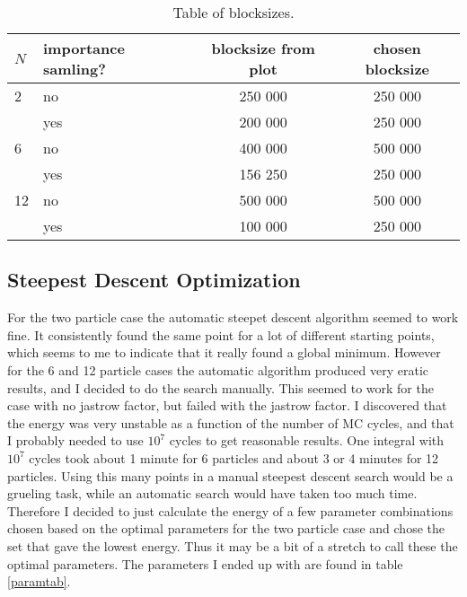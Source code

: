 \documentclass[a4paper,English,10pt]{article}
\begin{document}
\begin{table}
  \begin{center}
    \caption{Table of blocksizes. }
    \label{blocktable}
    \begin{tabular}{llcc}
      \toprule
      $N$ & importance samling? & blocksize from plot & chosen blocksize \\
      \midrule
      2 & no & 250 000 & 250 000\\
      & yes & 200 000 & 250 000\\
      \midrule
      6 & no & 400 000 & 500 000\\
      & yes & 156 250 & 250 000\\
      \midrule
      12 & no & 500 000 & 500 000\\
      & yes & 100 000 & 250 000\\
      \bottomrule
    \end{tabular}
  \end{center}
\end{table}



\subsection{Steepest Descent Optimization}
For the two particle case the automatic steepet descent algorithm seemed to work fine. It consistently found the same point
for a lot of different starting points, which seems to me to indicate that it really found a global minimum. However for the 6 and 12 particle
cases the automatic algorithm produced very eratic results, and I decided to do the search manually. This seemed to work for the case with no jastrow factor,
but failed with the jastrow factor. I discovered that the energy was very unstable as a function of the number of MC cycles, and that I probably needed
to use $10^7$ cycles to get reasonable results. One integral with $10^7$ cycles took about 1 minute for 6 particles and about 3 or 4 minutes for 12 particles.
Using this many points in a manual steepest descent search would be a grueling task, while an automatic search would have taken too much time. Therefore I decided
to just calculate the energy of a few parameter combinations chosen based on the optimal parameters for the two particle case and chose the set
that gave the lowest energy. Thus it may be a bit of a stretch to call these the optimal parameters. The parameters I ended up with are found in table \ref{paramtab}.
\end{document}
